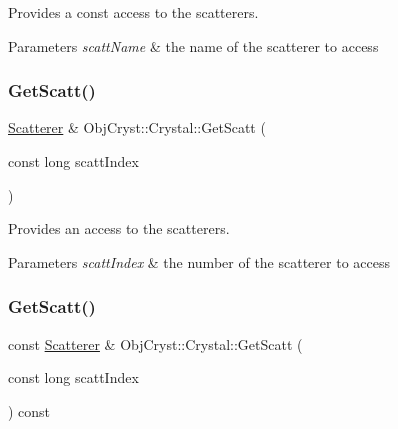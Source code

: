 Provides a const access to the scatterers. 


\begin{DoxyParams}{Parameters}
{\em scatt\+Name} & the name of the scatterer to access \\
\hline
\end{DoxyParams}
\mbox{\label{class_obj_cryst_1_1_crystal_adbd7f79dc30dd69a268fa9cc1c2cfed4}} 
\subsubsection{\texorpdfstring{GetScatt()}{GetScatt()}\hspace{0.1cm}{\footnotesize\ttfamily [3/4]}}
{\footnotesize\ttfamily \mbox{\hyperlink{class_obj_cryst_1_1_scatterer}{Scatterer}} \& Obj\+Cryst\+::\+Crystal\+::\+Get\+Scatt (\begin{DoxyParamCaption}\item[{const long}]{scatt\+Index }\end{DoxyParamCaption})}



Provides an access to the scatterers. 


\begin{DoxyParams}{Parameters}
{\em scatt\+Index} & the number of the scatterer to access \\
\hline
\end{DoxyParams}
\mbox{\label{class_obj_cryst_1_1_crystal_adab70eb1a70a84ae93b57384cd6b56fc}} 
\subsubsection{\texorpdfstring{GetScatt()}{GetScatt()}\hspace{0.1cm}{\footnotesize\ttfamily [4/4]}}
{\footnotesize\ttfamily const \mbox{\hyperlink{class_obj_cryst_1_1_scatterer}{Scatterer}} \& Obj\+Cryst\+::\+Crystal\+::\+Get\+Scatt (\begin{DoxyParamCaption}\item[{const long}]{scatt\+Index }\end{DoxyParamCaption}) const}



